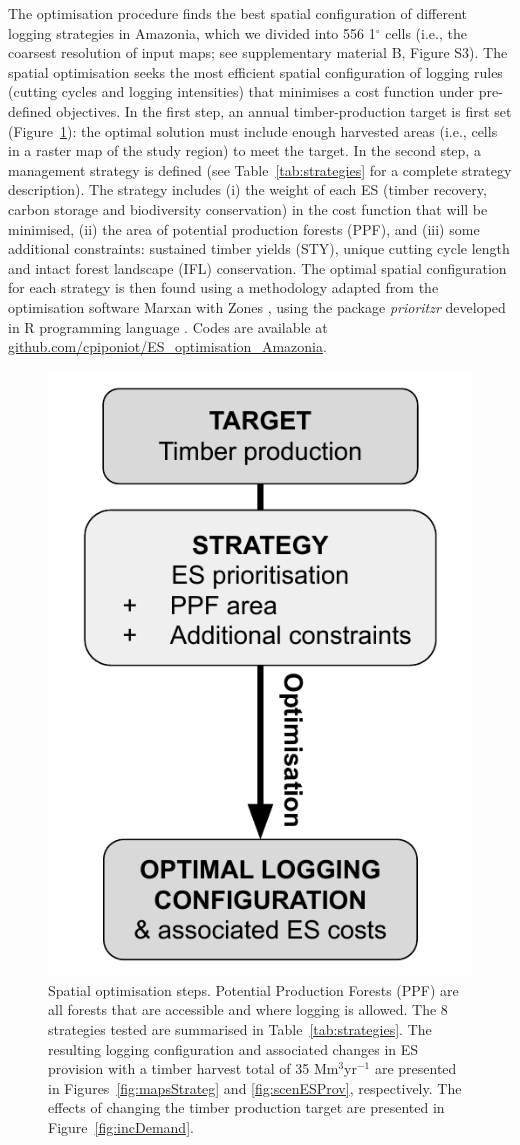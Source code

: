 \documentclass{article}
\begin{document}
The optimisation procedure finds the best spatial configuration of different logging strategies in Amazonia, which we divided into 556 1$^{\circ}$ cells (i.e., the coarsest resolution of input maps; see supplementary material B, Figure S3). The spatial optimisation seeks the most efficient spatial configuration of logging rules (cutting cycles and logging intensities) that minimises a cost function under pre-defined objectives. In the first step, an annual timber-production target is first set (Figure~\ref{fig:basicDiagram}): the optimal solution must include enough harvested areas (i.e., cells in a raster map of the study region) to meet the target. In the second step, a management strategy is defined (see Table~\ref{tab:strategies} for a complete strategy description). The strategy includes (i) the weight of each ES (timber recovery, carbon storage and biodiversity conservation) in the cost function that will be minimised, (ii) the area of potential production forests (PPF), and (iii) some additional constraints: sustained timber yields (STY), unique cutting cycle length and intact forest landscape (IFL) conservation. The optimal spatial configuration for each strategy is then found using a methodology adapted from the optimisation software Marxan with Zones \cite{Watts2009}, using the package \textit{prioritzr} \cite{Hanson2018} developed in R programming language \cite{RCoreTeam2017}. Codes are available at \url{github.com/cpiponiot/ES_optimisation_Amazonia}. 

\begin{figure}
    \centering
    \includegraphics[width = 0.6\linewidth]{graphs/diagramSpatOptim}
    \caption{Spatial optimisation steps. Potential Production Forests (PPF) are all forests that are accessible and where logging is allowed. The 8 strategies tested are summarised in Table~\ref{tab:strategies}. The resulting logging configuration and associated changes in ES provision with a timber harvest total of 35 Mm$^3$yr$^{-1}$ are presented in Figures~\ref{fig:mapsStrateg} and \ref{fig:scenESProv}, respectively. The effects of changing the timber production target are presented in Figure~\ref{fig:incDemand}.}
    \label{fig:basicDiagram}
\end{figure}
\end{document}
